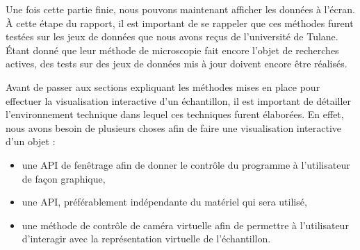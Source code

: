 {	%
	Une fois cette partie finie, nous pouvons maintenant afficher les données à l'écran. \`A cette étape du rapport, il est important de se rappeler que ces méthodes furent testées sur les jeux de données que nous avons reçus de l'université de Tulane. Étant donné que leur méthode de microscopie fait encore l'objet de recherches actives, des tests sur des jeux de données mis à jour doivent encore être réalisés.\par

	Avant de passer aux sections expliquant les méthodes mises en place pour effectuer la visualisation interactive d'un échantillon, il est important de détailler l'environnement technique dans lequel ces techniques furent élaborées. En effet, nous avons besoin de plusieurs choses afin de faire une visualisation interactive d'un objet :\begin{itemize}
		\item une API de fenêtrage afin de donner le contrôle du programme à l'utilisateur de façon graphique,
		\item une API, préférablement indépendante du matériel qui sera utilisé,
		\item une méthode de contrôle de caméra virtuelle afin de permettre à l'utilisateur d'interagir avec la représentation virtuelle de l'échantillon.
	\end{itemize}\par

}
